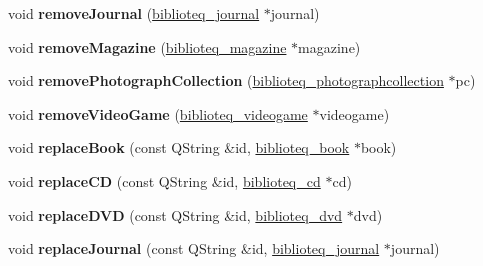 \begin{DoxyCompactItemize}
\item 
void {\bfseries remove\+Journal} (\hyperlink{classbiblioteq__journal}{biblioteq\+\_\+journal} $\ast$journal)\hypertarget{classbiblioteq_a0f0ef4b0727fc0b382f7e0efd05eb56c}{}\label{classbiblioteq_a0f0ef4b0727fc0b382f7e0efd05eb56c}

\item 
void {\bfseries remove\+Magazine} (\hyperlink{classbiblioteq__magazine}{biblioteq\+\_\+magazine} $\ast$magazine)\hypertarget{classbiblioteq_a7c37e0b965155c55477dc77ffdc44d0c}{}\label{classbiblioteq_a7c37e0b965155c55477dc77ffdc44d0c}

\item 
void {\bfseries remove\+Photograph\+Collection} (\hyperlink{classbiblioteq__photographcollection}{biblioteq\+\_\+photographcollection} $\ast$pc)\hypertarget{classbiblioteq_a5e581fcca72d629a4b2c0d1bf7f86faa}{}\label{classbiblioteq_a5e581fcca72d629a4b2c0d1bf7f86faa}

\item 
void {\bfseries remove\+Video\+Game} (\hyperlink{classbiblioteq__videogame}{biblioteq\+\_\+videogame} $\ast$videogame)\hypertarget{classbiblioteq_a1d6c81d17b07a84ae48474c7a00d0ba8}{}\label{classbiblioteq_a1d6c81d17b07a84ae48474c7a00d0ba8}

\item 
void {\bfseries replace\+Book} (const Q\+String \&id, \hyperlink{classbiblioteq__book}{biblioteq\+\_\+book} $\ast$book)\hypertarget{classbiblioteq_a30d09d4fa9241f0566ca5378f8031db1}{}\label{classbiblioteq_a30d09d4fa9241f0566ca5378f8031db1}

\item 
void {\bfseries replace\+CD} (const Q\+String \&id, \hyperlink{classbiblioteq__cd}{biblioteq\+\_\+cd} $\ast$cd)\hypertarget{classbiblioteq_a158fb9bccec884e7ac11a624017735bd}{}\label{classbiblioteq_a158fb9bccec884e7ac11a624017735bd}

\item 
void {\bfseries replace\+D\+VD} (const Q\+String \&id, \hyperlink{classbiblioteq__dvd}{biblioteq\+\_\+dvd} $\ast$dvd)\hypertarget{classbiblioteq_aee527720c5b3e27aa8bce2285ba5c9ff}{}\label{classbiblioteq_aee527720c5b3e27aa8bce2285ba5c9ff}

\item 
void {\bfseries replace\+Journal} (const Q\+String \&id, \hyperlink{classbiblioteq__journal}{biblioteq\+\_\+journal} $\ast$journal)\hypertarget{classbiblioteq_adcfba86f54a0cff1e51961ff56c0feb8}{}\label{classbiblioteq_adcfba86f54a0cff1e51961ff56c0feb8}


\end{DoxyCompactItemize}
